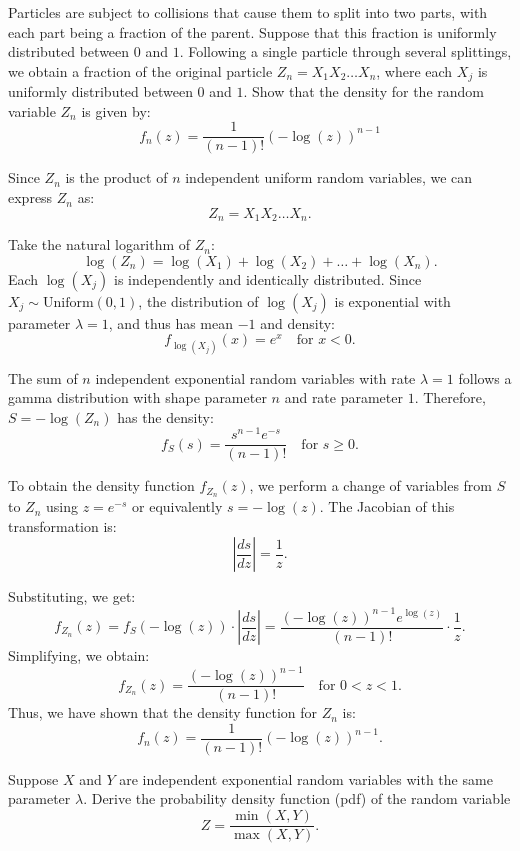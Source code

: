 \begin{exercise}
Particles are subject to collisions that cause them to split into two parts, with each part being a fraction of the parent. Suppose that this fraction is uniformly distributed between \(0\) and \(1\). Following a single particle through several splittings, we obtain a fraction of the original particle \( Z_n = X_1 X_2 \dots X_n \), where each \( X_j \) is uniformly distributed between \(0\) and \(1\). Show that the density for the random variable \( Z_n \) is given by:
\[
f_n(z) = \frac{1}{(n - 1)!}(-\log(z))^{n - 1}
\]
\end{exercise}

\begin{solution}
Since \( Z_n \) is the product of \( n \) independent uniform random variables, we can express \( Z_n \) as:
   \[
   Z_n = X_1 X_2 \dots X_n.
   \]

Take the natural logarithm of \( Z_n \):
   \[
   \log(Z_n) = \log(X_1) + \log(X_2) + \dots + \log(X_n).
   \]
   Each \( \log(X_j) \) is independently and identically distributed. Since \( X_j \sim \text{Uniform}(0, 1) \), the distribution of \( \log(X_j) \) is exponential with parameter \( \lambda = 1 \), and thus has mean \( -1 \) and density:
   \[
   f_{\log(X_j)}(x) = e^x \quad \text{for } x < 0.
   \]

The sum of \( n \) independent exponential random variables with rate \( \lambda = 1 \) follows a gamma distribution with shape parameter \( n \) and rate parameter \( 1 \). Therefore, \( S = -\log(Z_n) \) has the density:
   \[
   f_S(s) = \frac{s^{n-1} e^{-s}}{(n-1)!} \quad \text{for } s \geq 0.
   \]

To obtain the density function \( f_{Z_n}(z) \), we perform a change of variables from \( S \) to \( Z_n \) using \( z = e^{-s} \) or equivalently \( s = -\log(z) \). The Jacobian of this transformation is:
   \[
   \left| \frac{ds}{dz} \right| = \frac{1}{z}.
   \]

Substituting, we get:
   \[
   f_{Z_n}(z) = f_S(-\log(z)) \cdot \left| \frac{ds}{dz} \right| = \frac{(-\log(z))^{n-1} e^{\log(z)}}{(n-1)!} \cdot \frac{1}{z}.
   \]
   Simplifying, we obtain:
   \[
   f_{Z_n}(z) = \frac{(-\log(z))^{n-1}}{(n-1)!} \quad \text{for } 0 < z < 1.
   \]
Thus, we have shown that the density function for \( Z_n \) is:
\[
f_n(z) = \frac{1}{(n - 1)!}(-\log(z))^{n - 1}.
\]
\end{solution}

\begin{exercise}
Suppose \( X \) and \( Y \) are independent exponential random variables with the same parameter \( \lambda \). Derive the probability density function (pdf) of the random variable 
\[
Z = \frac{\min(X,Y)}{\max(X,Y)}.
\]
\end{exercise}

